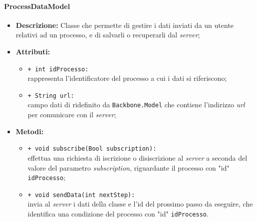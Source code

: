 \paragraph{ProcessDataModel}
\label{processDataModel}
\begin{flushleft}
\begin{itemize}
\item \textbf{Descrizione:} Classe che permette di gestire i dati inviati da un utente relativi ad un processo, e di salvarli o recuperarli dal \textit{server};
\item \textbf{Attributi:}
\begin{sloppypar}
\begin{itemize}
\item \texttt{+ int idProcesso:}\\ rappresenta l'identificatore del processo a cui i dati si riferiscono;
\item \texttt{+ String url:}\\ campo dati di ridefinito da \texttt{Backbone.Model} che contiene l'indirizzo \textit{url} per comunicare con il \textit{server};
\end{itemize}
\end{sloppypar}
\item \textbf{Metodi:}
\begin{sloppypar}
\begin{itemize}
\item \texttt{+ void subscribe(Bool subscription):}\\ effettua una richiesta di iscrizione o disiscrizione al \textit{server} a seconda del valore del parametro \textit{subscription}, riguardante il processo con "id" \texttt{idProcesso};
\item \texttt{+ void sendData(int nextStep):}\\ invia al \textit{server} i dati della classe e l'id del prossimo passo da eseguire, che identifica una condizione del processo con "id" \texttt{idProcesso}.
\end{itemize}
\end{sloppypar}
\end{itemize}
\end{flushleft}

